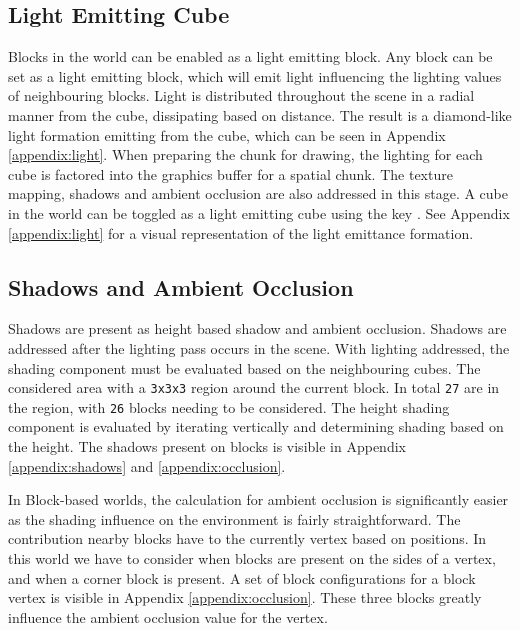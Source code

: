 \documentclass[a4paper,11pt,titlepage]{scrartcl}
\begin{document}
\subsection{Light Emitting Cube}
\label{section:lights}
Blocks in the world can be enabled as a light emitting block.  Any block can be set as a light emitting block, which will emit light influencing the lighting values of neighbouring blocks.  Light is distributed throughout the scene in a radial manner from the cube, dissipating based on distance.  The result is a diamond-like light formation emitting from the cube, which can be seen in Appendix \ref{appendix:light}.  When preparing the chunk for drawing, the lighting for each cube is factored into the graphics buffer for a spatial chunk.  The texture mapping, shadows and ambient occlusion are also addressed in this stage.  
\vskip 2.5mm\noindent
A cube in the world can be toggled as a light emitting cube using the key .  See Appendix \ref{appendix:light} for a visual representation of the light emittance formation.
    
\subsection{Shadows and Ambient Occlusion}
\label{section:shadows}
Shadows are present as height based shadow and ambient occlusion.  Shadows are addressed after the lighting pass occurs in the scene.  With lighting addressed, the shading component must be evaluated based on the neighbouring cubes.  The considered area with a \texttt{3x3x3} region around the current block.  In total \texttt{27} are in the region, with \texttt{26} blocks needing to be considered.  The height shading component is evaluated by iterating vertically and determining shading based on the height.  The shadows present on blocks is visible in Appendix \ref{appendix:shadows} and \ref{appendix:occlusion}.

In Block-based worlds, the calculation for ambient occlusion is significantly easier as the shading influence on the environment is fairly straightforward.  The contribution nearby blocks have to the currently vertex based on positions.  In this world we have to consider when blocks are present on the sides of a vertex, and when a corner block is present.  A set of block configurations for a block vertex is visible in Appendix \ref{appendix:occlusion}.  These three blocks greatly influence the ambient occlusion value for the vertex.

\end{document}
